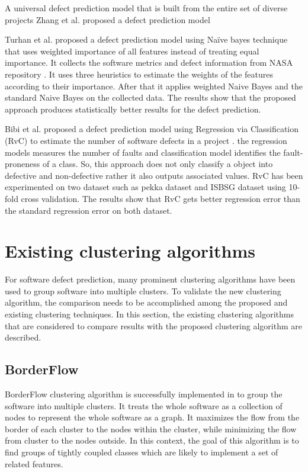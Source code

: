 \documentclass[12pt]{report}
\begin{document}
A universal defect prediction model that is built from the entire set of diverse projects Zhang et al. proposed a defect prediction model 

Turhan et al. proposed a defect prediction model using Naïve bayes technique that uses weighted importance of all features instead of treating equal importance\cite{turhan2007software}. It collects the software metrics and defect information from NASA repository \cite{nasa2007respository}. It uses three heuristics to estimate the weights of the features according to their importance. After that it applies weighted Naive Bayes and the standard Naive Bayes on the collected data. The results show that the proposed approach produces statistically better results for the defect prediction.  

Bibi et al. proposed a defect prediction model using Regression via Classification (RvC) to estimate the number of software defects in a project \cite{bibi2006software,bibi2008regression}. the regression models measures the number of faults and classification model identifies the fault-proneness of a class. So, this approach does not only classify a object into defective and non-defective rather it also outputs associated values. RvC has been experimented on two dataset such as pekka dataset and ISBSG dataset \cite{isbsg} using 10-fold cross validation. The results show that RvC gets better regression error than the standard regression error on both dataset.    


\section{Existing clustering algorithms}

For software defect prediction, many prominent clustering algorithms have been used to group software into multiple clusters. To validate the new clustering algorithm, the comparison needs to be accomplished among the proposed and existing clustering techniques. In this section, the existing clustering algorithms that are considered to compare results with the proposed clustering algorithm are described.

\subsection{BorderFlow}
BorderFlow clustering algorithm is successfully implemented in \cite{scanniello2011clustering,scanniello2013class} to group the software into multiple clusters. It treats the whole software as a collection of nodes to represent the whole software as a graph. It maximizes the flow from the border of each cluster to the nodes within the cluster, while minimizing the flow from cluster to the nodes outside.  In this context, the goal of this algorithm is to find groups of tightly coupled classes which are likely to implement a set of related features.
\end{document}

